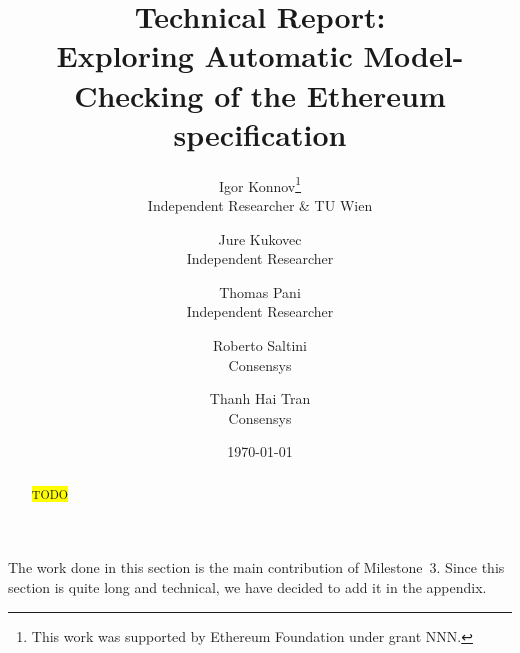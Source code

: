 \documentclass[12pt]{article}
\title{Technical Report:\\
       Exploring Automatic Model-Checking of the Ethereum specification}
\author{%
    Igor Konnov\thanks{This work was supported by Ethereum Foundation
    under grant NNN.}\\ \small Independent Researcher \& TU Wien \\
    \and
    Jure Kukovec\footnotemark[1] \\ \small Independent Researcher \\
    \and
    Thomas Pani\footnotemark[1] \\ \small Independent Researcher\\
    \and
    Roberto Saltini \\ \small Consensys \\
    \and
    Thanh Hai Tran \\ \small Consensys
}
\date{\today}
\begin{document}
\maketitle

\begin{abstract}
  \colorbox{yellow}{TODO}
\end{abstract}

\setcounter{tocdepth}{2}  %
\tableofcontents




















\pagebreak

\appendix

The work done in this section is the main contribution of Milestone~3.  Since
this section is quite long and technical, we have decided to add it in the
appendix.




\end{document}
